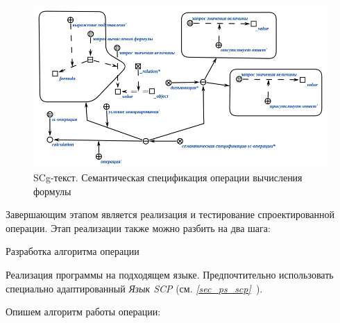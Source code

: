 \begin{figure}[H]
	\includegraphics[scale=0.8]{images/part7/chapter_learning_systems/formula-calculation-spec-kbe.png}
	\caption{SCg-текст. Семантическая спецификация операции вычисления формулы}
	\label{fig:formula-calculation-spec-kbe}
\end{figure}

Завершающим этапом является реализация и тестирование спроектированной операции. Этап реализации также можно разбить на два шага:

\begin{textitemize}
	\item Разработка алгоритма операции
	\item Реализация программы на подходящем языке. Предпочтительно использовать специально адаптированный \textit{Язык SCP} (см. \textit{\ref{sec_ps_scp}~}).
\end{textitemize}

Опишем алгоритм работы операции:

